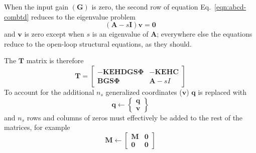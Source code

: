 \documentclass[11pt,openany,twoside]{book}
\numberwithin{equation}{section}		%
\newcommand{\Matrix}[1]{\boldsymbol{#1}}
\newcommand{\Vector}[1]{\boldsymbol{#1}}
\newcommand{\Eqn}[1]{Eq.\ \ref{#1}}  %
\begin{document}
When the input gain $(\Matrix{G})$ is zero, the second row of equation
\Eqn{eqn:abcd-combtd} reduces to the eigenvalue problem
\begin{equation}
\left(\Matrix{A} - s\Matrix{I}\right)\Vector{v} = \Matrix{0}
\end{equation}
and $\Vector{v}$ is zero except when $s$ is an eigenvalue of $\Matrix{A}$;
everywhere else the equations reduce to the open-loop structural
equations, as they should.

The $\Matrix{T}$ matrix is therefore
\begin{equation}
\Matrix{T} = \left[ \begin{array}{cc}
-\Matrix{KEHDGS\Phi}      & -\Matrix{KEHC}   \\
\Matrix{BGS\Phi}  &  \Matrix{A} - sI
\end{array} \right]
\end{equation}
To account for the additional $n_s$ generalized coordinates ($\Vector{v}$)
$\Vector{q}$ is replaced with
\begin{equation}
\Vector{q} \leftarrow \left\{ \begin{array}{c}
\Vector{q} \\
\Vector{v}
\end{array} \right\}
\end{equation}
and $n_s$ rows and columns of zeros must effectively be added to
the rest of the matrices, for example
\begin{equation}
\Matrix{M} \leftarrow \left[ \begin{array}{cc}
\Matrix{M} & \Matrix{0}       \\
\Matrix{0} &  \Matrix{0}
\end{array} \right]
\end{equation}
\par
\end{document}
